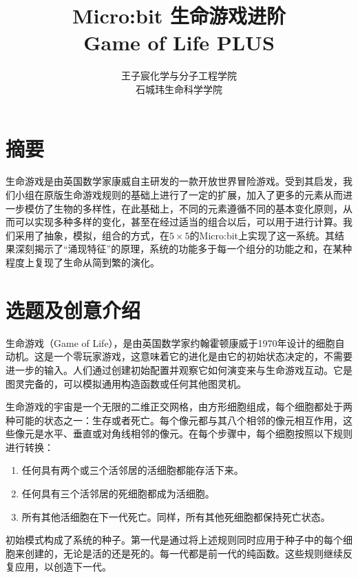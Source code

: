 \documentclass[11pt]{article}
\title{\Huge\textbf{{Micro:bit 生命游戏进阶\\
            Game of Life PLUS}}}
\author{\large{王子宸\quad 化学与分子工程学院} \\
            \large{石城玮\quad 生命科学学院}}
\begin{document}
    
    \maketitle
    
    \tableofcontents

    \setcounter{section}{-1}
    \hypertarget{ux6458ux8981}{%
\section{摘要}\label{ux6458ux8981}}

\hspace{2em}生命游戏是由英国数学家康威自主研发的一款开放世界冒险游戏。受到其启发，我们小组在原版生命游戏规则的基础上进行了一定的扩展，加入了更多的元素从而进一步模仿了生物的多样性，在此基础上，不同的元素遵循不同的基本变化原则，从而可以实现多种多样的变化，甚至在经过适当的组合以后，可以用于进行计算。我们采用了抽象，模拟，组合的方式，在\(5\times 5\)的Micro:bit上实现了这一系统。其结果深刻揭示了“涌现特征”的原理，系统的功能多于每一个组分的功能之和，在某种程度上复现了生命从简到繁的演化。

    \hypertarget{ux9009ux9898ux53caux521bux610fux4ecbux7ecd}{%
\section{选题及创意介绍}\label{ux9009ux9898ux53caux521bux610fux4ecbux7ecd}}

\hspace{2em} 生命游戏（Game of Life），是由英国数学家约翰霍顿康威于1970年设计的细胞自动机。这是一个零玩家游戏，这意味着它的进化是由它的初始状态决定的，不需要进一步的输入。人们通过创建初始配置并观察它如何演变来与生命游戏互动。它是图灵完备的，可以模拟通用构造函数或任何其他图灵机。

\hspace{2em} 生命游戏的宇宙是一个无限的二维正交网格，由方形细胞组成，每个细胞都处于两种可能的状态之一：生存或者死亡。每个像元都与其八个相邻的像元相互作用，这些像元是水平、垂直或对角线相邻的像元。在每个步骤中，每个细胞按照以下规则进行转换：
\begin{enumerate}
    \item 任何具有两个或三个活邻居的活细胞都能存活下来。
    \item 任何具有三个活邻居的死细胞都成为活细胞。
    \item 所有其他活细胞在下一代死亡。同样，所有其他死细胞都保持死亡状态。
\end{enumerate}

\hspace{2em} 初始模式构成了系统的种子。第一代是通过将上述规则同时应用于种子中的每个细胞来创建的，无论是活的还是死的。每一代都是前一代的纯函数。这些规则继续反复应用，以创造下一代。
\end{document}
